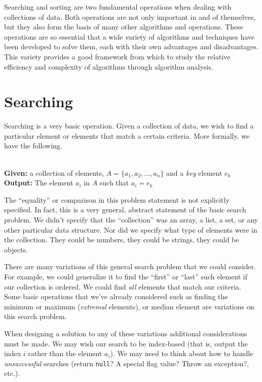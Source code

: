 

Searching and sorting are two fundamental operations when dealing
with collections of data.  Both operations are not only important in
and of themselves, but they also form the basis of many other algorithms
and operations.  These operations are so essential that a wide variety
of algorithms and techniques have been developed to solve them, each
with their own advantages and disadvantages.  This variety provides
a good framework from which to study the relative efficiency and complexity
of algorithms through algorithm analysis.

\section{Searching}

Searching is a very basic operation.  Given a collection of data, we
wish to find a particular element or elements that match a certain 
criteria.  More formally, we have the following.

\begin{problem}[Searching]
\label{problem:searching}
~\\
\textbf{Given:} a collection of elements, $A =\{a_1, a_2, \ldots, a_n\}$ 
and a \emph{key} element $e_k$\\
\textbf{Output:} The element $a_i$ in $A$ such that $a_i = e_k$
\end{problem}

The ``equality'' or comparison in this problem statement is not explicitly 
specified.  In 
fact, this is a very general, abstract statement of the basic search 
problem.  We didn't specify that the ``collection'' was an array, a list, 
a set, or any other particular data structure.  Nor did we specify what
type of elements were in the collection.  They could be numbers, they
could be strings, they could be objects.  

There are many variations of this general search problem that we could
consider.  For example, we could generalize it to find the ``first''
or ``last'' such element if our collection is ordered.  We could find
\emph{all} elements that match our criteria.  Some basic operations that 
we've already considered such as finding the minimum or maximum
(\emph{extremal} elements), or median element are variations on this search 
problem.

When designing a solution to any of these variations additional 
considerations must be made.  We may wish our search to be index-based 
(that is, output the index $i$ rather than the element $a_i$).  We
may need to think about how to handle \emph{unsuccessful} searches 
(return \texttt{null}?  A special flag value?  Throw an
exception?, etc.).

